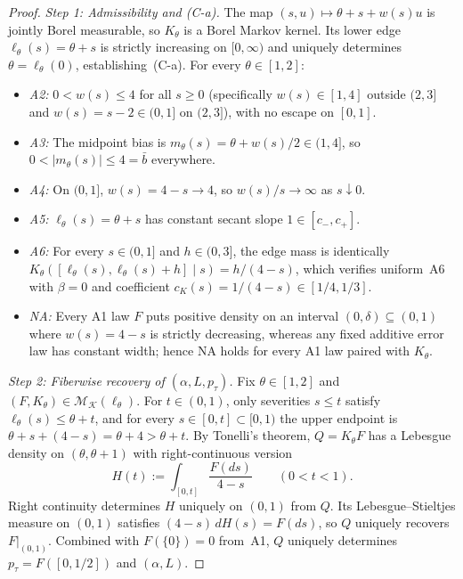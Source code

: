 \documentclass[11pt]{article}
\theoremstyle{plain}
\theoremstyle{definition}
\theoremstyle{remark}
\begin{document}
\begin{proof}
\emph{Step 1: Admissibility and \textup{(C-a)}.}
The map $(s, u) \mapsto \theta + s + w(s)u$ is jointly Borel measurable, so $K_\theta$ is a Borel Markov kernel. Its lower edge $\ell_\theta(s) = \theta + s$ is strictly increasing on $[0, \infty)$ and uniquely determines $\theta = \ell_\theta(0)$, establishing~\textup{(C-a)}. For every $\theta \in [1, 2]$:
\begin{itemize}[leftmargin=1.6em]
\item \emph{A2:} $0 < w(s) \le 4$ for all $s \ge 0$ (specifically $w(s) \in [1, 4]$ outside $(2, 3]$ and $w(s) = s - 2 \in (0, 1]$ on $(2, 3]$), with no escape on $[0, 1]$.
\item \emph{A3:} The midpoint bias is $m_\theta(s) = \theta + w(s)/2 \in (1, 4]$, so $0 < |m_\theta(s)| \le 4 = \bar b$ everywhere.
\item \emph{A4:} On $(0, 1]$, $w(s) = 4 - s \to 4$, so $w(s)/s \to \infty$ as $s \downarrow 0$.
\item \emph{A5:} $\ell_\theta(s) = \theta + s$ has constant secant slope $1 \in [c_-, c_+]$.
\item \emph{A6:} For every $s \in (0, 1]$ and $h \in (0, 3]$, the edge mass is identically $K_\theta([\ell_\theta(s), \ell_\theta(s) + h] \mid s) = h/(4 - s)$, which verifies uniform~A6 with $\beta = 0$ and coefficient $c_K(s) = 1/(4 - s) \in [1/4, 1/3]$.
\item \emph{NA:} Every A1 law $F$ puts positive density on an interval $(0, \delta) \subseteq (0, 1)$ where $w(s) = 4 - s$ is strictly decreasing, whereas any fixed additive error law has constant width; hence NA holds for every A1 law paired with $K_\theta$.
\end{itemize}

\emph{Step 2: Fiberwise recovery of $(\alpha, L, p_\tau)$.}
Fix $\theta \in [1, 2]$ and $(F, K_\theta) \in \mathcal{M}_{\mathcal{K}}(\ell_\theta)$.
For $t \in (0, 1)$, only severities $s \le t$ satisfy $\ell_\theta(s) \le \theta + t$, and for every $s \in [0, t] \subset [0, 1)$ the upper endpoint is $\theta + s + (4 - s) = \theta + 4 > \theta + t$.
By Tonelli's theorem, $Q = K_\theta F$ has a Lebesgue density on $(\theta, \theta + 1)$ with right-continuous version
\[
H(t) := \int_{[0, t]} \frac{F(ds)}{4 - s} \qquad (0 < t < 1).
\]
Right continuity determines $H$ uniquely on $(0, 1)$ from $Q$. Its Lebesgue--Stieltjes measure on $(0, 1)$ satisfies $(4 - s)\,dH(s) = F(ds)$, so $Q$ uniquely recovers $F|_{(0, 1)}$. Combined with $F(\{0\}) = 0$ from~A1, $Q$ uniquely determines $p_\tau = F([0, 1/2])$ and $(\alpha, L)$.


\end{proof}
\end{document}
